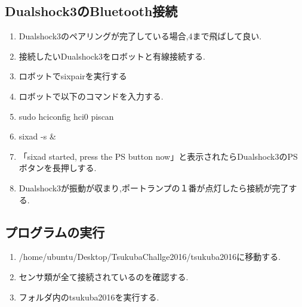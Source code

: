 \subsection{Dualshock3のBluetooth接続}
\begin{enumerate}
\item Dualshock3のペアリングが完了している場合,4まで飛ばして良い.
\item 接続したいDualshock3をロボットと有線接続する.
\item ロボットでsixpairを実行する
\item ロボットで以下のコマンドを入力する.
\item sudo hciconfig hci0 piscan
\item sixad -s \&
\item 「sixad started, press the PS button now」と表示されたらDualshock3のPSボタンを長押しする.
\item Dualshock3が振動が収まり,ポートランプの１番が点灯したら接続が完了する.
\end{enumerate}
\subsection{プログラムの実行}
\begin{enumerate}
\item /home/ubuntu/Desktop/TsukubaChallge2016/tsukuba2016に移動する.
\item センサ類が全て接続されているのを確認する.
\item フォルダ内のtsukuba2016を実行する.
\end{enumerate}
